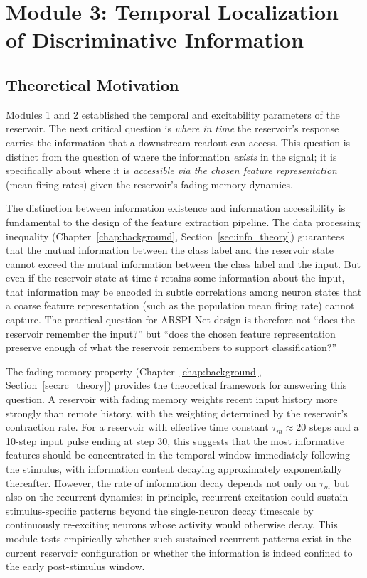 \section{Module 3: Temporal Localization of Discriminative Information}
\label{sec:module3}

\subsection{Theoretical Motivation}

Modules 1 and 2 established the temporal and excitability parameters of the reservoir. The next critical question is \emph{where in time} the reservoir's response carries the information that a downstream readout can access. This question is distinct from the question of where the information \emph{exists} in the signal; it is specifically about where it is \emph{accessible via the chosen feature representation} (mean firing rates) given the reservoir's fading-memory dynamics.

The distinction between information existence and information accessibility is fundamental to the design of the feature extraction pipeline. The data processing inequality (Chapter~\ref{chap:background}, Section~\ref{sec:info_theory}) guarantees that the mutual information between the class label and the reservoir state cannot exceed the mutual information between the class label and the input. But even if the reservoir state at time $t$ retains some information about the input, that information may be encoded in subtle correlations among neuron states that a coarse feature representation (such as the population mean firing rate) cannot capture. The practical question for ARSPI-Net design is therefore not ``does the reservoir remember the input?'' but ``does the chosen feature representation preserve enough of what the reservoir remembers to support classification?''

The fading-memory property (Chapter~\ref{chap:background}, Section~\ref{sec:rc_theory}) provides the theoretical framework for answering this question. A reservoir with fading memory weights recent input history more strongly than remote history, with the weighting determined by the reservoir's contraction rate. For a reservoir with effective time constant $\tau_m \approx 20$ steps and a 10-step input pulse ending at step 30, this suggests that the most informative features should be concentrated in the temporal window immediately following the stimulus, with information content decaying approximately exponentially thereafter. However, the rate of information decay depends not only on $\tau_m$ but also on the recurrent dynamics: in principle, recurrent excitation could sustain stimulus-specific patterns beyond the single-neuron decay timescale by continuously re-exciting neurons whose activity would otherwise decay. This module tests empirically whether such sustained recurrent patterns exist in the current reservoir configuration or whether the information is indeed confined to the early post-stimulus window.

